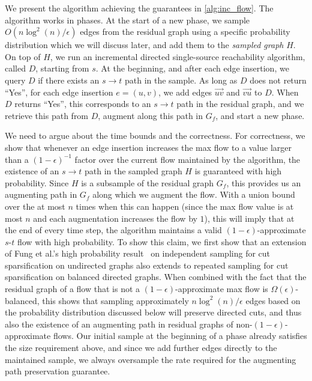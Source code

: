 \documentclass[11pt,a4paper]{article}
\newcommand{\eps}{\epsilon}
\begin{document}
We present the algorithm achieving the guarantees in \cref{alg:inc_flow}. The algorithm works in phases. At the start of a new phase, we sample $O(n \log^2 (n) / \eps)$ edges from the residual graph using a specific probability distribution which we will discuss later, and add them to the \emph{sampled graph} $H$. On top of $H$, we run an incremental directed single-source reachability algorithm, called $D$, starting from $s$. At the beginning, and after each edge insertion, we query $D$ if there exists an $s \to t$ path in the sample.
As long as $D$ does not return ``Yes'', for each edge insertion $e = (u,v)$, we add edges $\vec{uv}$ and $\vec{vu}$ to $D$. When $D$ returns ``Yes'', this corresponds to an $s \to t$ path in the residual graph, and we retrieve this path from $D$, augment along this path in $G_f$, and start a new phase.

We need to argue about the time bounds and the correctness. For correctness, we show that whenever an edge insertion increases the max flow to a value larger than a $(1-\eps)^{-1}$ factor over the current flow maintained by the algorithm, the existence of an $s \to t$ path in the sampled graph $H$ is guaranteed with high probability. Since $H$ is a subsample of the residual graph $G_f$, this provides us an augmenting path in $G_f$ along which we augment the flow.
With a union bound over the at most $n$ times when this can happen (since the max flow value is at most $n$ and each augmentation increases the flow by $1$), this will imply that at the end of every time step, the algorithm maintains a valid $(1-\eps)$-approximate $s$-$t$ flow with high probability.
To show this claim, we first show that an extension of Fung et al.'s high probability result~\cite{FHHP19sparsification} on independent sampling for cut sparsification on undirected graphs also extends to repeated sampling for cut sparsification on balanced directed graphs. When combined with the fact that the residual graph of a flow that is not a $(1-\eps)$-approximate max flow is $\Omega(\eps)$-balanced, this shows that sampling approximately $n \log^2(n)/\eps$ edges based on the probability distribution discussed below will preserve directed cuts, and thus also the existence of an augmenting path in residual graphs of non-$(1-\eps)$-approximate flows. Our initial sample at the beginning of a phase already satisfies the size requirement above, and since we add further edges directly to the maintained sample, we always oversample the rate required for the augmenting path preservation guarantee.
\end{document}
